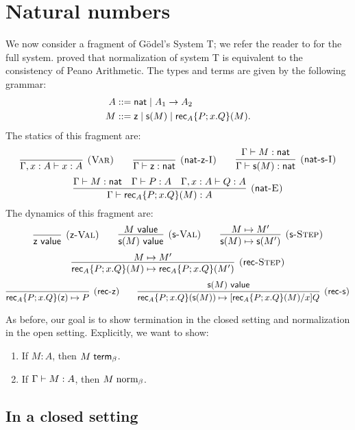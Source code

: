\documentclass{article}
\begin{document}
\section{Natural numbers}

We now consider a fragment of Gödel's System T; we refer the reader to \cite[Chapter~9]{Harper:16} for the full system.
\citeauthor{Godel:58} proved that normalization of system T is equivalent to the consistency of Peano Arithmetic.
The types and terms are given by the following grammar:
\begin{align*}
  A &::= \mathsf{nat} \mid A_1 \to A_2\\
  M &::= \mathsf{z} \mid \mathsf{s}(M) \mid \mathsf{rec}_{A}\{P; x.Q\}(M).
\end{align*}
The statics of this fragment are:
\[
  \infer[\rn{Var}]{\hasEF{\Gamma,x:A}{x}{A}}{\mathstrut}
  \qquad
  \infer[\rn{$\nat$-$\natz$-I}]{\hasEF{\Gamma}{\natz}{\nat}}{\mathstrut}
  \qquad
  \infer[\rn{$\nat$-$\natsop$-I}]{
    \hasEF{\Gamma}{\nats M}{\nat}
  }{
    \hasEF{\Gamma}{M}{\nat}\mathstrut
  }
\]
\[
  \infer[\rn{$\nat$-E}]{
    \hasEF{\Gamma}{\natrec{A}{P}{x}{Q}{M}}{A}
  }{
    \hasEF{\Gamma}{M}{\nat}
    &
    \hasEF{\Gamma}{P}{A}
    &
    \hasEF{\Gamma,x:A}{Q}{A}
  }
\]
The dynamics of this fragment are:
\[
  \infer[\rn{$\natz$-Val}]{\valueJ \natz}{}
  \qquad
  \infer[\rn{$\natsop$-Val}]{
    \valueJ{\nats M}
  }{
    \valueJ M
  }
  \qquad
  \infer[\rn{$\natsop$-Step}]{
    \step{\nats M}{\nats{M'}}
  }{
    \step{M}{M'}
  }
\]
\[
  \infer[\rn{$\natrecop$-Step}]{
    \step{\natrec{A}{P}{x}{Q}{M}}{\natrec{A}{P}{x}{Q}{M'}}
  }{
    \step{M}{M'}
  }
\]
\[
  \infer[\rn{$\natrecop$-$\natz$}]{\step{\natrec{A}{P}{x}{Q}{\natz}}{P}}{}
  \qquad
  \infer[\rn{$\natrecop$-$\natsop$}]{
    \step{\natrec{A}{P}{x}{Q}{\nats M}}{\subst{\natrec{A}{P}{x}{Q}{M}}{x}{Q}}
  }{
    \valueJ{\nats M}
  }
\]

As before, our goal is to show termination in the closed setting and normalization in the open setting.
Explicitly, we want to show:
\begin{enumerate}
\item If $M : A$, then ${M} \; \mathsf{term}_{\beta}$.\label{enum:desiderata1}
\item If $\Gamma \vdash M : A$, then $M \mathrel{\text{norm}_\beta}$.
\end{enumerate}

\subsection{In a closed setting}
\label{sec:nat-closed-setting}
\end{document}
